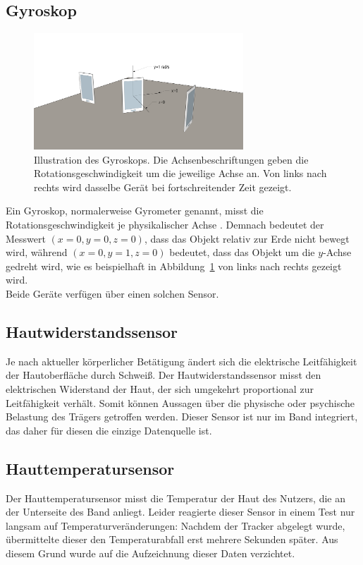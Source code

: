 \subsection{Gyroskop}
\begin{figure}
\centering
\includegraphics[clip=true,trim=0mm 0mm 0mm 0mm, width=0.7\textwidth]{img/gyroscope}
\caption[Illustration des Gyroskops]{Illustration des Gyroskops. Die Achsenbeschriftungen geben die Rotationsgeschwindigkeit um die jeweilige Achse an. Von links nach rechts wird dasselbe Gerät bei fortschreitender Zeit gezeigt.}
\label{fig:gyroscope}
\end{figure}
Ein Gyroskop, normalerweise Gyrometer genannt, misst die Rotationsgeschwindigkeit je physikalischer Achse \cite{SensorsOverview}. Demnach bedeutet der Messwert $(x=0, y=0, z=0)$, dass das Objekt relativ zur Erde nicht bewegt wird, während $(x=0, y=1, z=0)$ bedeutet, dass das Objekt um die $y$-Achse gedreht wird, wie es beispielhaft in Abbildung~\ref{fig:gyroscope} von links nach rechts gezeigt wird. \\
Beide Geräte verfügen über einen solchen Sensor.

\subsection{Hautwiderstandssensor}
Je nach aktueller körperlicher Betätigung ändert sich die elektrische Leitfähigkeit der Hautoberfläche durch Schweiß. Der Hautwiderstandssensor misst den elektrischen Widerstand der Haut, der sich umgekehrt proportional zur Leitfähigkeit verhält. Somit können Aussagen über die physische oder psychische Belastung des Trägers getroffen werden.
Dieser Sensor ist nur im Band integriert, das daher für diesen die einzige Datenquelle ist.

\subsection{Hauttemperatursensor}
Der Hauttemperatursensor misst die Temperatur der Haut des Nutzers, die an der Unterseite des Band anliegt. Leider reagierte dieser Sensor in einem Test nur langsam auf Temperaturveränderungen: Nachdem der Tracker abgelegt wurde, übermittelte dieser den Temperaturabfall erst mehrere Sekunden später. Aus diesem Grund wurde auf die Aufzeichnung dieser Daten verzichtet.

